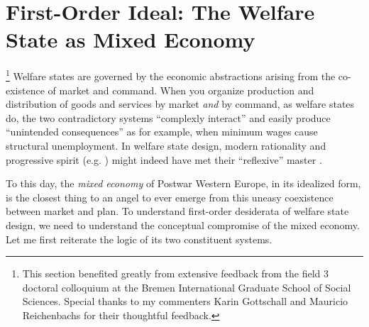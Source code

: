 

\section{First-Order Ideal: The Welfare State as Mixed Economy}\label{sec:mixedeconomy}

\footnote
	{This section benefited greatly from extensive feedback from the field 3 doctoral colloquium at the Bremen International Graduate School of Social Sciences. Special thanks to my commenters Karin Gottschall and Mauricio Reichenbachs for their thoughtful feedback.}
Welfare states are governed by the economic abstractions arising from the co-existence of market and command.
When you organize production and distribution of goods and services by market \emph{and} by command, as welfare states do, the two contradictory systems ``complexly interact'' \citep{Perrow-1999-aa} and easily produce ``unintended consequences'' \citep{Merton-1936-aa} as for example, when minimum wages cause structural unemployment. In welfare state design, modern rationality \citep{Weber-1920-aa} and progressive spirit (e.g. \citealt{Offe2010}) might indeed have met their ``reflexive'' master \citep{BeckBonss-2003-aa}. 

To this day, the \emph{mixed economy} of Postwar Western Europe, in its idealized form, is the closest thing to an angel to ever emerge from this uneasy coexistence between market and plan. To understand first-order desiderata of welfare state design, we need to understand the  conceptual compromise of the mixed economy. Let me first reiterate the logic of its two constituent systems.

